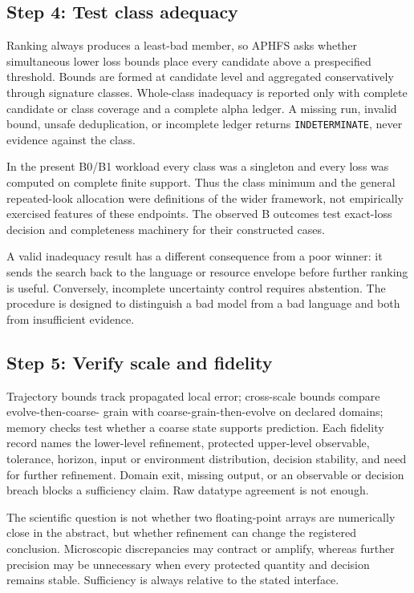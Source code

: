 \documentclass[10pt]{article}
\theoremstyle{definition}
\begin{document}
\subsection{Step 4: Test class adequacy}

Ranking always produces a least-bad member, so APHFS asks whether simultaneous lower loss bounds
place every candidate above a prespecified threshold. Bounds are formed at candidate level and
aggregated conservatively through signature classes. Whole-class inadequacy is reported only with
complete candidate or class coverage and a complete alpha ledger. A missing run, invalid bound,
unsafe deduplication, or incomplete ledger returns \texttt{INDETERMINATE}, never evidence against
the class.

In the present B0/B1 workload every class was a singleton and every loss was computed on complete
finite support. Thus the class minimum and the general repeated-look allocation were definitions
of the wider framework, not empirically exercised features of these endpoints. The observed B
outcomes test exact-loss decision and completeness machinery for their constructed cases.

A valid inadequacy result has a different consequence from a poor winner: it sends the search back
to the language or resource envelope before further ranking is useful. Conversely, incomplete
uncertainty control requires abstention. The procedure is designed to distinguish a bad model
from a bad language and both from insufficient evidence.

\subsection{Step 5: Verify scale and fidelity}

Trajectory bounds track propagated local error; cross-scale bounds compare evolve-then-coarse-
grain with coarse-grain-then-evolve on declared domains; memory checks test whether a coarse state
supports prediction. Each fidelity record names the lower-level refinement, protected upper-level
observable, tolerance, horizon, input or environment distribution, decision stability, and need
for further refinement. Domain exit, missing output, or an observable or decision breach blocks a
sufficiency claim. Raw datatype agreement is not enough.

The scientific question is not whether two floating-point arrays are numerically close in the
abstract, but whether refinement can change the registered conclusion. Microscopic discrepancies
may contract or amplify, whereas further precision may be unnecessary when every protected
quantity and decision remains stable. Sufficiency is always relative to the stated interface.
\end{document}
